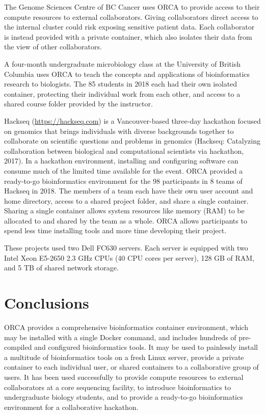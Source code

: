 \documentclass{bioinfo}
\begin{document}
The Genome Sciences Centre of BC Cancer uses ORCA to provide access to their compute resources to external collaborators. Giving collaborators direct access to the internal cluster could risk exposing sensitive patient data. Each collaborator is instead provided with a private container, which also isolates their data from the view of other collaborators.

A four-month undergraduate microbiology class at the University of British Columbia uses ORCA to teach the concepts and applications of bioinformatics research to biologists. The 85 students in 2018 each had their own isolated container, protecting their individual work from each other, and access to a shared course folder provided by the instructor.

Hackseq (\url{https://hackseq.com}) is a Vancouver-based three-day hackathon focused on genomics that brings individuals with diverse backgrounds together to collaborate on scientific questions and problems in genomics (Hackseq: Catalyzing collaboration between biological and computational scientists via hackathon, 2017). In a hackathon environment, installing and configuring software can consume much of the limited time available for the event. ORCA provided a ready-to-go bioinformatics environment for the 98 participants in 8 teams of Hackseq in 2018. The members of a team each have their own user account and home directory, access to a shared project folder, and share a single container. Sharing a single container allows system resources like memory (RAM) to be allocated to and shared by the team as a whole. ORCA allows participants to spend less time installing tools and more time developing their project.

These projects used two Dell FC630 servers. Each server is equipped with two Intel Xeon E5-2650 2.3 GHz CPUs (40 CPU cores per server), 128 GB of RAM, and 5 TB of shared network storage.

\section{Conclusions}

ORCA provides a comprehensive bioinformatics container environment, which may be installed with a single Docker command, and includes hundreds of pre-compiled and configured bioinformatics tools. It may be used to painlessly install a multitude of bioinformatics tools on a fresh Linux server, provide a private container to each individual user, or shared containers to a collaborative group of users. It has been used successfully to provide compute resources to external collaborators at a core sequencing facility, to introduce bioinformatics to undergraduate biology students, and to provide a ready-to-go bioinformatics environment for a collaborative hackathon.
\end{document}
